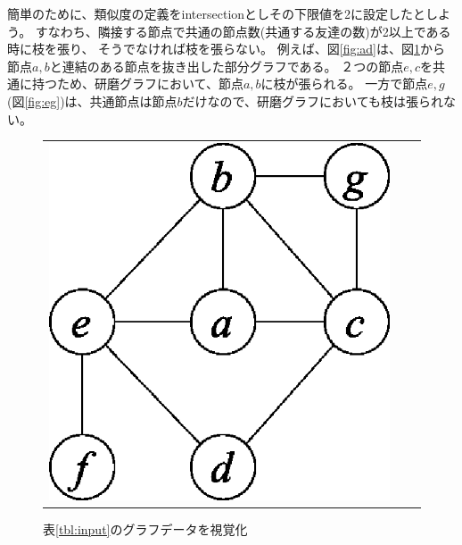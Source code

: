 簡単のために、類似度の定義をintersectionとしその下限値を2に設定したとしよう。
すなわち、隣接する節点で共通の節点数(共通する友達の数)が2以上である時に枝を張り、
そうでなければ枝を張らない。
例えば、図\ref{fig:ad}は、図\ref{fig:inputg}から節点$a,b$と連結のある節点を抜き出した部分グラフである。
２つの節点$e,c$を共通に持つため、研磨グラフにおいて、節点$a,b$に枝が張られる。
一方で節点$e,g$(図\ref{fig:eg})は、共通節点は節点$b$だけなので、研磨グラフにおいても枝は張られない。

\begin{figure}[htbp]
\begin{center}
\begin{tabular}{ccc}

\begin{minipage}{0.3\hsize}
\begin{center}
\includegraphics[scale=0.5]{./inputg.eps}
\caption{表\ref{tbl:input}のグラフデータを視覚化\label{fig:inputg}}
\end{center}
\end{minipage}


\end{tabular}
\end{center}
\end{figure}
